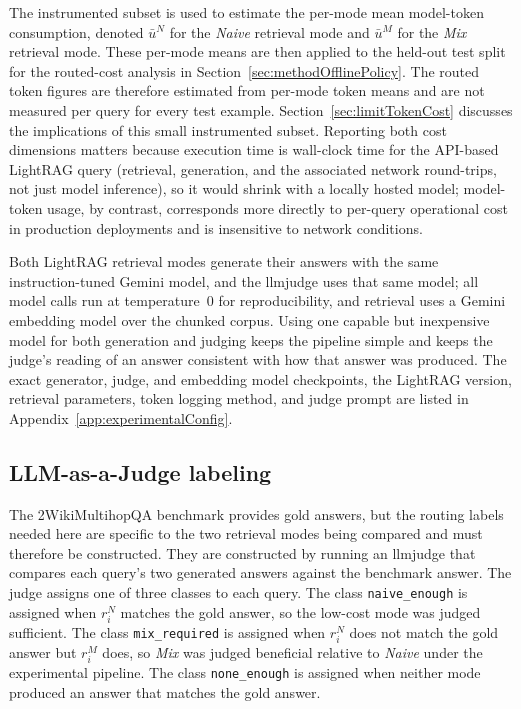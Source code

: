 \documentclass[english, bibtex]{kththesis}               %
\numberwithin{listing}{chapter}
\begin{document}
The instrumented subset is used to estimate the per-mode mean model-token consumption, denoted $\bar{u}^N$ for the \emph{Naive} retrieval mode and $\bar{u}^M$ for the \emph{Mix} retrieval mode. These per-mode means are then applied to the held-out test split for the routed-cost analysis in Section~\ref{sec:methodOfflinePolicy}. The routed token figures are therefore estimated from per-mode token means and are not measured per query for every test example. Section~\ref{sec:limitTokenCost} discusses the implications of this small instrumented subset. Reporting both cost dimensions matters because execution time is wall-clock time for the API-based LightRAG query (retrieval, generation, and the associated network round-trips, not just model inference), so it would shrink with a locally hosted model; model-token usage, by contrast, corresponds more directly to per-query operational cost in production deployments and is insensitive to network conditions.

Both LightRAG retrieval modes generate their answers with the same instruction-tuned Gemini model, and the \gls{llmjudge} uses that same model; all model calls run at temperature~$0$ for reproducibility, and retrieval uses a Gemini embedding model over the chunked corpus. Using one capable but inexpensive model for both generation and judging keeps the pipeline simple and keeps the judge's reading of an answer consistent with how that answer was produced. The exact generator, judge, and embedding model checkpoints, the LightRAG version, retrieval parameters, token logging method, and judge prompt are listed in Appendix~\ref{app:experimentalConfig}.

\subsection{LLM-as-a-Judge labeling}
\label{sec:methodJudge}

The 2WikiMultihopQA benchmark provides gold answers, but the routing labels needed here are specific to the two retrieval modes being compared and must therefore be constructed. They are constructed by running an \gls{llmjudge} \cite{zheng2023judge} that compares each query's two generated answers against the benchmark answer. The judge assigns one of three classes to each query. The class \texttt{naive\_enough} is assigned when \(r_i^N\) matches the gold answer, so the low-cost mode was judged sufficient. The class \texttt{mix\_required} is assigned when \(r_i^N\) does not match the gold answer but \(r_i^M\) does, so \emph{Mix} was judged beneficial relative to \emph{Naive} under the experimental pipeline. The class \texttt{none\_enough} is assigned when neither mode produced an answer that matches the gold answer.
\end{document}
